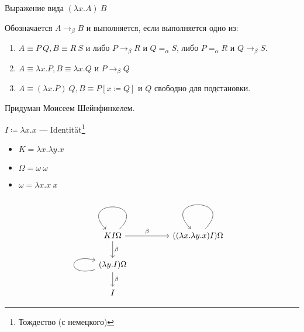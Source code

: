 \begin{definition}
    Выражение вида \((\lambda x.A)\ B\)
\end{definition}

\begin{definition}
    Обозначается \(A \to_\beta B\) и выполняется, если выполняется одно из:
    \begin{enumerate}
        \item \(A \equiv P\ Q, B \equiv R\ S\) и либо \(P \to_\beta R\) и \(Q =_\alpha S\), либо \(P =_\alpha R\) и \(Q \to_\beta S\).
        \item \(A \equiv \lambda x.P, B \equiv \lambda x.Q\) и \(P \to_\beta Q\)
        \item \(A \equiv (\lambda x.P)\ Q, B \equiv P [x \coloneqq Q]\) и \(Q\) свободно для подстановки.
    \end{enumerate}
\end{definition}

\begin{definition}
    Придуман Моисеем Шейнфинкелем.

    \(I \coloneqq \lambda x.x\) --- Identit\"
    at\footnote{Тождество (с немецкого)}
\end{definition}

\begin{definition}\itemfix
    \begin{itemize}
        \item \(K = \lambda x.\lambda y.x\)
        \item \(\Omega = \omega\ \omega\)
        \item \(\omega = \lambda x.x\ x\)
    \end{itemize}
\end{definition}

\begin{example}
    \[\begin{tikzcd}[ampersand replacement=\&]
            KI\Omega \arrow{rr}{\beta} \arrow{d}{\beta} \arrow[loop] \&  \& ((\lambda x.\lambda y.x) I) \Omega \arrow[loop] \\
            (\lambda y.I) \Omega \arrow[loop left] \arrow{d}{\beta}                                                              \&  \&                                                                                          \\
            I                                                                                                    \&  \&
        \end{tikzcd}\]
\end{example}

